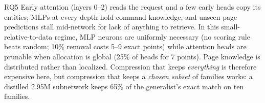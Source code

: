 \begin{finding}{RQ5}
Early attention (layers 0--2) reads the request and a few early heads copy its
entities; MLPs at every depth hold command knowledge, and unseen-page
predictions stall mid-network for lack of anything to retrieve. In this
small-relative-to-data regime, MLP neurons are uniformly necessary (no scoring
rule beats random; 10\% removal costs 5--9 exact points) while attention heads
are prunable when allocation is global (25\% of heads for 7 points). Page
knowledge is distributed rather than localized. Compression that keeps
\emph{everything} is therefore expensive here, but compression that keeps a
\emph{chosen subset} of families works: a distilled 2.95M subnetwork keeps
65\% of the generalist's exact match on ten families.
\end{finding}
